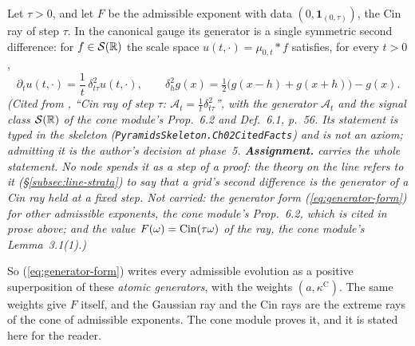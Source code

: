 \begin{theorem}
\label{thm:cited-A13}
\notready
Let $\tau > 0$, and let $F$ be the admissible exponent with data $(0, \mathbf{1}_{(0,\tau)})$, the
Cin ray of step $\tau$. In the canonical gauge its generator is a single symmetric second
difference: for $f \in \mathcal{S}(\mathbb{R})$ the scale space $u(t,\cdot) = \mu_{0,t} * f$ satisfies,
for every $t > 0$,
\[
  \partial_t u(t,\cdot) = \frac1t\,\delta^2_{t\tau}u(t,\cdot), \qquad
  \delta^2_h g(x) = \tfrac12\bigl(g(x - h) + g(x + h)\bigr) - g(x).
\]
\statusA\quad{}\quad\emph{(Cited from , ``Cin
ray of step $\tau$: $\mathcal{A}_t = \frac1t\delta^2_{t\tau}$'', with the generator $\mathcal{A}_t$
and the signal class $\mathcal{S}(\mathbb{R})$ of the cone module's Prop.~6.2 and Def.~6.1, p.~56. Its statement is typed in the skeleton
(\texttt{PyramidsSkeleton.Ch02CitedFacts}) and is not an axiom; admitting it is the author's decision at phase~5. \textbf{Assignment.} 
carries the whole statement. No node spends it as a step of a proof: the theory on the line refers
to it (\S\ref{subsec:line-strata}) to say that a grid's second difference is the generator of a Cin
ray held at a fixed step. Not carried: the generator form (\ref{eq:generator-form}) for other
admissible exponents, the cone module's Prop.~6.2, which is cited in prose above; and the value
$F(\omega) = \operatorname{Cin}(\tau\omega)$ of the ray, the cone module's Lemma~3.1(1).)}
\end{theorem}

So (\ref{eq:generator-form}) writes every admissible evolution as a positive superposition of these
\emph{atomic generators}, with the weights $(a, \kappa^{\mathrm C})$. The same weights give $F$
itself, and the Gaussian ray and the Cin rays are the extreme rays of the cone of admissible
exponents. The cone module proves it, and it is stated here for the reader.

